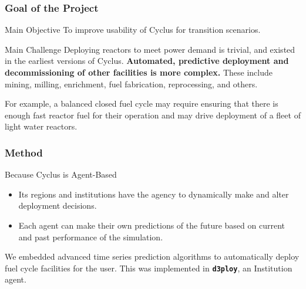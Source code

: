\begin{frame}
  \frametitle{Goal of the Project}
        \begin{block}{Main Objective}
              To improve usability of Cyclus for transition scenarios.
        \end{block}
        

        \begin{block}{Main Challenge}
              Deploying reactors to meet power demand is trivial, and existed 
                in the earliest versions of Cyclus.
              \textbf{Automated, predictive deployment and decommissioning of 
                other facilities is more complex.} These include mining, 
                milling, enrichment, fuel 
                fabrication, reprocessing, and others. 

              For example, a balanced closed fuel cycle may require ensuring 
                that there is enough fast reactor fuel for their operation and 
                may drive deployment of a fleet of light water reactors.
        \end{block}
\end{frame}

\begin{frame}
        \frametitle{Method}
        \begin{block}{Because Cyclus is Agent-Based}
                \begin{itemize}
                        \item Its regions and institutions have the agency to dynamically make and alter deployment decisions.
                        \item Each agent can make their own predictions of the future based on current and past performance of the simulation.
                \end{itemize} 
                
                We embedded advanced time series prediction algorithms to automatically 
                deploy fuel cycle facilities for the user. This was implemented 
                in \textbf{\texttt{d3ploy}}, an Institution agent. 
        \end{block}
\end{frame}

